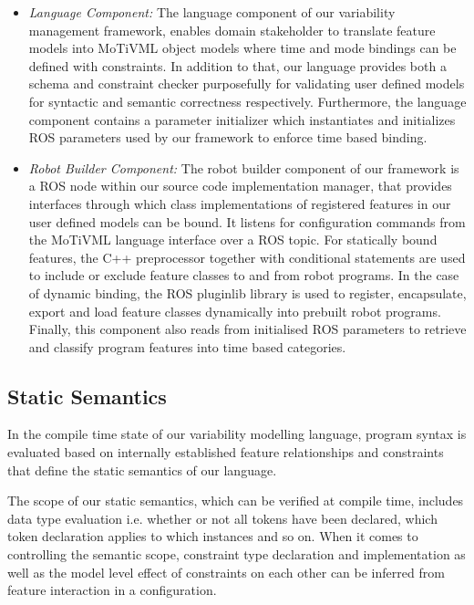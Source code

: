 \documentclass[conference]{IEEEtran}
\begin{document}
\begin{itemize}
	\item \textit{Language Component: }
	The language component of our variability management framework, enables domain stakeholder to translate feature models into MoTiVML object models where time and mode bindings can be defined with constraints. In addition to that, our language provides both a schema and constraint checker purposefully for validating user defined models for syntactic and semantic correctness respectively. Furthermore, the language component contains a parameter initializer which instantiates and initializes ROS parameters used by our framework to enforce time based binding.
	\item \textit{Robot Builder Component: }
	The robot builder component of our framework is a ROS node within our source code implementation manager, that provides interfaces through which class implementations of registered features in our user defined models can be bound. It listens for configuration commands from the MoTiVML language interface over a ROS topic. For statically bound features, the C++ preprocessor together with conditional statements are used to include or exclude feature classes to and from robot programs.  In the case of dynamic binding, the ROS pluginlib library is used to register, encapsulate, export and load feature classes dynamically into prebuilt robot programs. Finally, this component also reads from initialised ROS parameters to retrieve and classify program features into time based categories. 
\end{itemize}


\subsection{Static Semantics}
In the compile time state of our variability modelling language, program syntax is evaluated based on internally established feature relationships and constraints that define the static semantics of our language.

The scope of our static semantics, which can be verified  at compile time, includes data type evaluation i.e. whether or not all tokens have been declared, which token declaration applies to which instances and so on. When it comes to controlling the semantic scope, constraint type declaration and implementation as well as the model level effect of constraints on each other can be inferred from feature interaction in a configuration.
\end{document}
